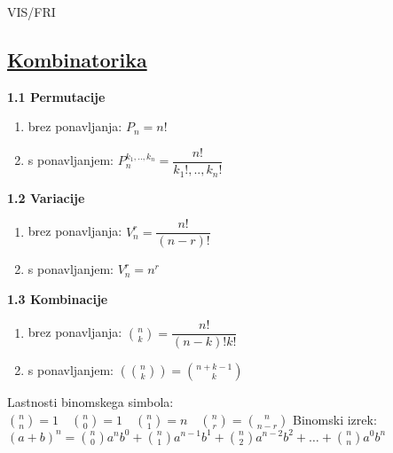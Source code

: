 \documentclass{article}
\begin{document}
\begin{center}
    {\small VIS/FRI \par}
\end{center}

\begin{multicols}{2}



\section{\underline{Kombinatorika}}


\textbf{1.1 Permutacije}
\begin{small}
    \begin{enumerate}
        \item brez ponavljanja: $P_{n} = n!$
        \item s ponavljanjem: $P_{n}^{k_{1},..,k_{n}} = \dfrac{n!}{k_{1}!,..,k_{n}!}$
    \end{enumerate}        
\end{small}

\textbf{1.2 Variacije}
    \begin{small}
        \begin{enumerate}
            \item brez ponavljanja: $V_{n}^{r} = \dfrac{n!}{(n - r)!}$
            \item s ponavljanjem: $V_{n}^{r} = n^{r}$
        \end{enumerate}                
    \end{small}

\textbf{1.3 Kombinacije}
\begin{small}
    \begin{enumerate}
        \item brez ponavljanja: ${n\choose k} = \dfrac{n!}{(n - k)! k!}$
        \item s ponavljanjem: $({n\choose k}) = {n + k - 1\choose k}$
    \end{enumerate}
    \begin{center}
        Lastnosti binomskega simbola:
        \begin{math}
            {n \choose n} = 1 \quad
            {n \choose 0} = 1 \quad
            {n \choose 1} = n \quad
            {n \choose r} = {n \choose n - r} 
        \end{math}
        Binomski izrek:\\
        \begin{math}
            (a + b)^{n} =
            {n \choose 0} a^{n} b^{0} + {n \choose 1} a^{n - 1} b^{1} +
            {n \choose 2} a^{n - 2} b^{2} + \dots + {n \choose n} a^{0} b^{n}
        \end{math}
    

\end{center}
\end{small}
\end{multicols}
\end{document}
